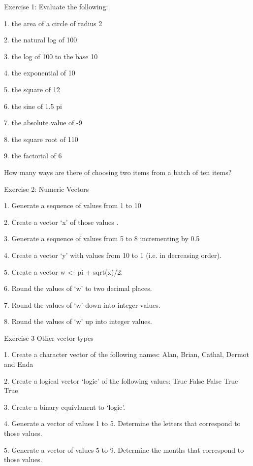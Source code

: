  

 Exercise 1: Evaluate the following:

 
1.
the area of a circle of radius 2             

2.
the natural log of  100                           

3.
the log of 100 to the base 10   

4.
the exponential of 10                           

5.
the square of 12                                         

6.
the sine of 1.5 pi                           

7.
the absolute value of  -9             

8.
the square root of 110             

9.
the factorial of 6


 

How many ways are there of choosing two items from a batch of ten items?

 

Exercise 2: Numeric Vectors

 

1.      Generate a sequence of values from 1 to 10

2.      Create a vector ‘x’ of those values .

3.      Generate a sequence of values from 5 to 8 incrementing by 0.5

4.      Create a vector ‘y’ with values from 10 to 1 (i.e. in decreasing order).

5.      Create a vector w <- pi + sqrt(x)/2.

6.      Round the values of ‘w’ to two decimal places.

7.      Round the values of ‘w’ down into integer values.

8.      Round the values of ‘w’ up into integer values.

 

Exercise 3 Other vector types

 
1.
Create a character vector of the following names: Alan, Brian, Cathal, Dermot and Enda

2.
Create a logical vector ‘logic’ of the following values: True False False True True

3.
Create a binary equivlanent to ‘logic’.

4.
Generate a vector of values 1 to 5.  Determine the letters that correspond to those values.

5.
Generate a vector of values 5 to 9.  Determine the months that correspond to those values.


